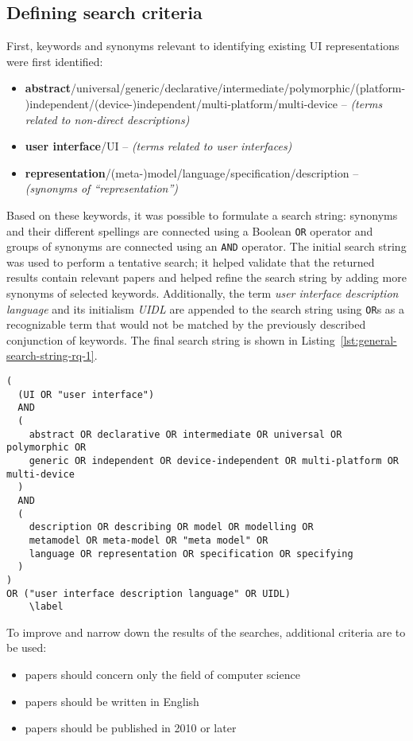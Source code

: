 \subsection{Defining search criteria}\label{subsec:defining-search-criteria}
First, keywords and synonyms relevant to identifying existing UI representations were first identified:
\begin{itemize}
    \item \textbf{abstract}/universal/generic/declarative/intermediate/polymorphic/(platform-)independent/(device-)independent/multi-platform/multi-device -- \textit{(terms related to non-direct descriptions)}
    \item \textbf{user interface}/UI -- \textit{(terms related to user interfaces)}
    \item \textbf{representation}/(meta-)model/language/specification/description -- \textit{(synonyms of \enquote{representation})}
\end{itemize}
Based on these keywords, it was possible to formulate a search string: synonyms and their different spellings are connected using a Boolean \texttt{OR} operator and groups of synonyms are connected using an \texttt{AND} operator.
The initial search string was used to perform a tentative search;
it helped validate that the returned results contain relevant papers and helped refine the search string by adding more synonyms of selected keywords.
Additionally, the term \emph{user interface description language} and its initialism \emph{UIDL} are appended to the search string using \texttt{OR}s as a recognizable term that would not be matched by the previously described conjunction of keywords.
The final search string is shown in Listing~\ref{lst:general-search-string-rq-1}.
\begin{lstlisting}[label=lst:general-search-string-rq-1,caption=The search string, basicstyle=\ttfamily]
(
  (UI OR "user interface")
  AND
  (
    abstract OR declarative OR intermediate OR universal OR polymorphic OR
    generic OR independent OR device-independent OR multi-platform OR multi-device
  )
  AND
  (
    description OR describing OR model OR modelling OR
    metamodel OR meta-model OR "meta model" OR
    language OR representation OR specification OR specifying
  )
)
OR ("user interface description language" OR UIDL)
    \label
\end{lstlisting}

To improve and narrow down the results of the searches, additional criteria are to be used:
\begin{samepage}
\begin{itemize}
    \item papers should concern only the field of computer science
    \item papers should be written in English
    \item papers should be published in 2010 or later
\end{itemize}
\end{samepage}

